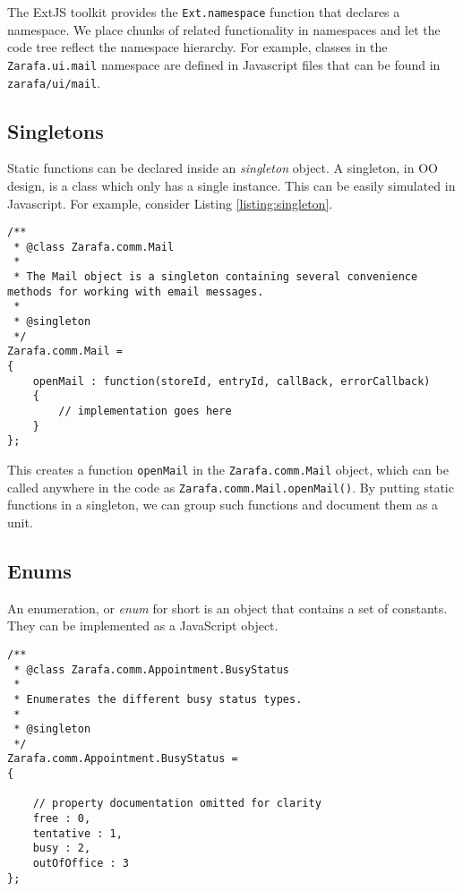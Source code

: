 The ExtJS toolkit provides the {\tt Ext.namespace} function that declares a namespace. We place chunks of
related functionality in namespaces and let the code tree reflect the namespace hierarchy. For example, classes
in the {\tt Zarafa.ui.mail} namespace are defined in Javascript files that can be found in {\tt zarafa/ui/mail}.

\subsection{Singletons}

Static functions can be declared inside an \emph{singleton} object. A singleton, in OO design, is a class which
only has a single instance. This can be easily simulated in Javascript. For example, consider Listing 
\ref{listing:singleton}.

\begin{lstlisting}[caption={Declaring a singleton.}, label=listing:singleton]
/**
 * @class Zarafa.comm.Mail
 * 
 * The Mail object is a singleton containing several convenience methods for working with email messages.
 * 
 * @singleton
 */
Zarafa.comm.Mail = 
{
	openMail : function(storeId, entryId, callBack, errorCallback)
	{
		// implementation goes here
	}
};
\end{lstlisting}

This creates a function {\tt openMail} in the {\tt Zarafa.comm.Mail} object, which can be called anywhere in the
code as {\tt Zarafa.comm.Mail.openMail()}. By putting static functions in a singleton, we can group such
functions and document them as a unit.

\subsection{Enums}

An enumeration, or \emph{enum} for short is an object that contains a set of constants. They can be 
implemented as a JavaScript object.

\begin{lstlisting}[caption={Declaring an enumeration}, label=listing:enum]
/**
 * @class Zarafa.comm.Appointment.BusyStatus
 * 
 * Enumerates the different busy status types. 
 * 
 * @singleton
 */
Zarafa.comm.Appointment.BusyStatus = 
{
	
	// property documentation omitted for clarity
	free : 0,
	tentative : 1,
	busy : 2,
	outOfOffice : 3
};
\end{lstlisting}

